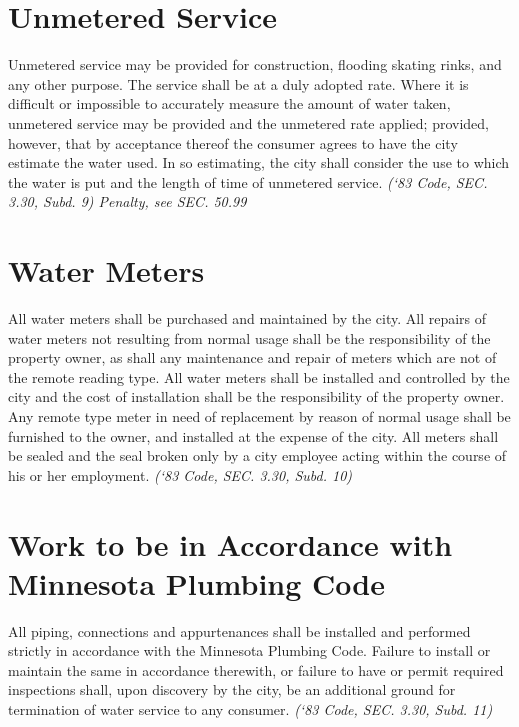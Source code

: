 \section{Unmetered Service}
Unmetered service may be provided for construction, flooding skating rinks, and any other purpose.  The service shall be at a duly adopted rate.  Where it is difficult or impossible to accurately measure the amount of water taken, unmetered service may be provided and the unmetered rate applied; provided, however, that by acceptance thereof the consumer agrees to have the city estimate the water used.  In so estimating, the city shall consider the use to which the water is put and the length of time of unmetered service.\newline
\emph{(‘83 Code, SEC. 3.30, Subd. 9) Penalty, see SEC. 50.99}
\section{Water Meters}
All water meters shall be purchased and maintained by the city.  All repairs of water meters not resulting from normal usage shall be the responsibility of the property owner, as shall any maintenance and repair of meters which are not of the remote reading type.  All water meters shall be installed and controlled by the city and the cost of installation shall be the responsibility of the property owner.  Any remote type meter in need of replacement by reason of normal usage shall be furnished to the owner, and installed at the expense of the city.  All meters shall be sealed and the seal broken only by a city employee acting within the course of his or her employment.\newline
\emph{(‘83 Code, SEC. 3.30, Subd. 10)}
\section{Work to be in Accordance with Minnesota Plumbing Code}
All piping, connections and appurtenances shall be installed and performed strictly in accordance with the Minnesota Plumbing Code.  Failure to install or maintain the same in accordance therewith, or failure to have or permit required inspections shall, upon discovery by the city, be an additional ground for termination of water service to any consumer.\newline
\emph{(‘83 Code, SEC. 3.30, Subd. 11)}

%
